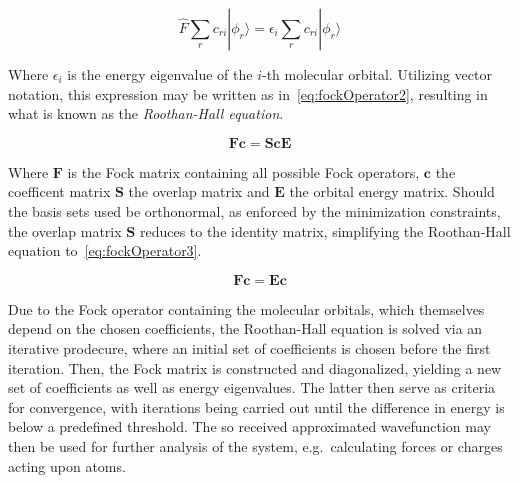 \documentclass[12pt]{article}
\begin{document}
\begin{equation}
  \hat{F}\sum_{r}^{}c_{r i}|\phi_{r}\rangle = \epsilon_i\sum_{r}^{}c_{r i}|\phi_{r}\rangle
  \label{eq:fockOperator}
\end{equation}

\bigskip

\noindent Where $\epsilon_i$ is the energy eigenvalue of the $i$-th molecular orbital. Utilizing vector notation, this expression may be written as in~\ref{eq:fockOperator2}, resulting in what is known as the \textit{Roothan-Hall equation}.


\begin{equation}
  \mathbf{Fc} = \mathbf{Sc}\mathbf{E}
  \label{eq:fockOperator2}
\end{equation}

\noindent Where $\mathbf{F}$ is the Fock matrix containing all possible Fock operators, $\mathbf{c}$ the coefficent matrix $\mathbf{S}$ the overlap matrix and $\mathbf{E}$ the orbital energy matrix.
Should the basis sets used be orthonormal, as enforced by the minimization constraints, the overlap matrix $\mathbf{S}$ reduces to the identity matrix, simplifying the Roothan-Hall equation to~\ref{eq:fockOperator3}.

\begin{equation}
  \mathbf{Fc} = \mathbf{Ec}
  \label{eq:fockOperator3}
\end{equation}

\bigskip

\noindent Due to the Fock operator containing the molecular orbitals, which themselves depend on the chosen coefficients, the Roothan-Hall equation is solved via an iterative prodecure, where an initial set of coefficients is chosen before the first iteration.
Then, the Fock matrix is constructed and diagonalized, yielding a new set of coefficients as well as energy eigenvalues.
The latter then serve as criteria for convergence, with iterations being carried out until the difference in energy is below a predefined threshold.
The so received approximated wavefunction may then be used for further analysis of the system, e.g.~calculating forces or charges acting upon atoms.
\end{document}
